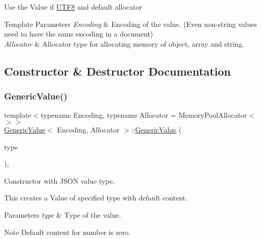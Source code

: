 Use the Value if \hyperlink{struct_u_t_f8}{U\+T\+F8} and default allocator


\begin{DoxyTemplParams}{Template Parameters}
{\em Encoding} & Encoding of the value. (Even non-\/string values need to have the same encoding in a document) \\
\hline
{\em Allocator} & Allocator type for allocating memory of object, array and string. \\
\hline
\end{DoxyTemplParams}


\subsection{Constructor \& Destructor Documentation}
\mbox{\label{class_generic_value_a83c8f84b8e61f2f40414b703b75aea61}} 
\subsubsection{\texorpdfstring{Generic\+Value()}{GenericValue()}\hspace{0.1cm}{\footnotesize\ttfamily [1/5]}}
{\footnotesize\ttfamily template$<$typename Encoding, typename Allocator = Memory\+Pool\+Allocator$<$$>$$>$ \\
\hyperlink{class_generic_value}{Generic\+Value}$<$ Encoding, Allocator $>$\+::\hyperlink{class_generic_value}{Generic\+Value} (\begin{DoxyParamCaption}\item[{\hyperlink{rapidjson_8h_a1d1cfd8ffb84e947f82999c682b666a7}{Type}}]{type }\end{DoxyParamCaption})\hspace{0.3cm}{\ttfamily [inline]}, {\ttfamily [explicit]}}



Constructor with J\+S\+ON value type. 

This creates a Value of specified type with default content. 
\begin{DoxyParams}{Parameters}
{\em type} & Type of the value. \\
\hline
\end{DoxyParams}
\begin{DoxyNote}{Note}
Default content for number is zero. 
\end{DoxyNote}
\mbox{\label{class_generic_value_a5161c0c98ba9144c50a38acde28a5ede}} 
